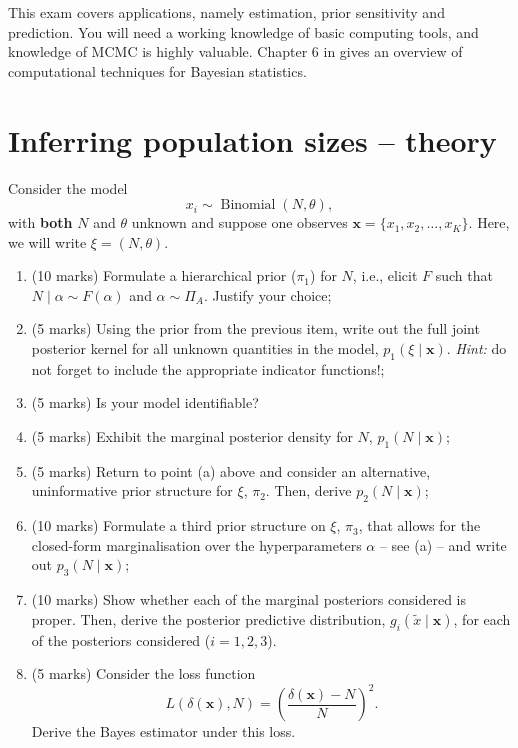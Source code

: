 \documentclass[a4paper,10pt, notitlepage]{report}
\begin{document}
This exam covers applications, namely estimation, prior sensitivity and prediction.
You will need a working knowledge of basic computing tools, and knowledge of MCMC is highly valuable.
Chapter 6 in \cite{Robert2007} gives an overview of computational techniques for Bayesian statistics.

\section*{Inferring population sizes -- theory}

Consider the model
\begin{equation*}
 x_i \sim \operatorname{Binomial}(N, \theta),
\end{equation*}
with \textbf{both} $N$ and $\theta$ unknown and suppose one observes $\boldsymbol{x} = \{x_1, x_2, \ldots, x_K\}$.
Here, we will write $\xi = (N, \theta)$.

\begin{enumerate}[label=\alph*)]
 \item (10 marks) Formulate a hierarchical prior ($\pi_1$) for $N$, i.e., elicit $F$ such that $N \mid \alpha \sim F(\alpha)$ and $\alpha  \sim \Pi_A$.
 Justify your choice; 
 \item (5 marks) Using the prior from the previous item, write out the full joint posterior kernel for all unknown quantities in the model, $p_1(\xi \mid \boldsymbol{x})$. \textit{Hint:} do not forget to include the appropriate indicator functions!;
 \item (5 marks) Is your model identifiable?
 \item (5 marks) Exhibit the marginal posterior density for $N$, $p_1(N \mid \boldsymbol{x})$;
 \item (5 marks) Return to point (a) above and consider an alternative, uninformative prior structure for $\xi$, $\pi_2$.
 Then, derive $p_2(N \mid \boldsymbol{x})$;
 \item (10 marks) Formulate a third prior structure on $\xi$, $\pi_3$, that allows for the closed-form marginalisation over the hyperparameters $\alpha$ -- see (a) -- and write out $p_3(N \mid \boldsymbol{x})$;
 \item (10 marks) Show whether each of the marginal posteriors considered is proper.
 Then, derive the posterior predictive distribution, $g_i(\tilde{x} \mid \boldsymbol{x})$, for each of the posteriors considered ($i = 1, 2, 3$).
 \item (5 marks) Consider the loss function
 \begin{equation}
 \label{eq:relative_loss}
  L(\delta(\boldsymbol{x}), N) = \left(\frac{\delta(\boldsymbol{x})-N}{N} \right)^2.
 \end{equation}
 Derive the Bayes estimator under this loss.
\end{enumerate}
\end{document}

